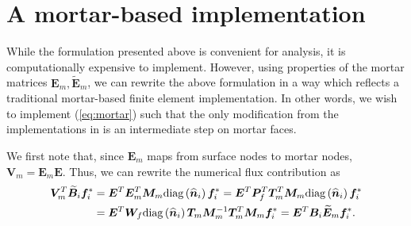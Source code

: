 \documentclass{svjour3}                     %
\renewcommand{\hat}{\widehat}
\renewcommand{\tilde}{\widetilde}
\newcommand{\diag}[1]{{\rm diag}\LRp{#1}}
\newcommand{\td}[2]{\frac{{\rm d}#1}{{\rm d}{\rm #2}}}
\newcommand{\LRp}[1]{\left( #1 \right)}
\begin{document}
%

\section{A mortar-based implementation}

While the formulation presented above is convenient for analysis, it is computationally expensive to implement.  However, using properties of the mortar matrices $\bm{E}_m, \tilde{\bm{E}}_m$, we can rewrite the above formulation in a way which reflects a traditional mortar-based finite element implementation.  In other words, we wish to implement (\ref{eq:mortar}) such that the only modification from the implementations in \cite{chan2017discretely} is an intermediate step on mortar faces.  

We first note that, since $\bm{E}_m$ maps from surface nodes to mortar nodes, $\bm{V}_m = \bm{E}_m \bm{E}$.  Thus, we can rewrite the numerical flux contribution as
\begin{align*}
 \bm{V}_m^T\tilde{\bm{B}}_i\bm{f}_i^* &= \bm{E}^T \bm{E}_m^T \bm{M}_m\diag{\hat{\bm{n}}_i} \bm{f}_i^* = \bm{E}^T  \bm{P}_f^T\bm{T}_m^T\bm{M}_m\diag{\hat{\bm{n}}_i} \bm{f}_i^*\\
 &= \bm{E}^T \bm{W}_f \diag{\hat{\bm{n}}_i} \bm{T}_m\bm{M}_m^{-1}\bm{T}_m^T\bm{M}_m \bm{f}_i^* =  \bm{E}^T \bm{B}_i \tilde{\bm{E}}_m\bm{f}_i^*.
\end{align*}
\end{document}
